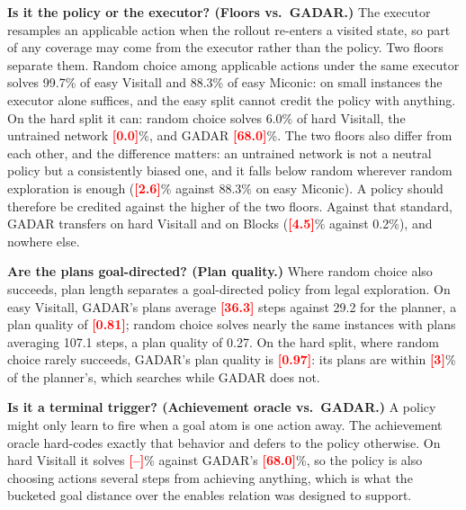 \documentclass[letterpaper]{article} %
\newcommand{\gadar}{GADAR}                 %
\newcommand{\todonum}[1]{\textcolor{red}{\textbf{[#1]}}}
\begin{document}
\textbf{Is it the policy or the executor? (Floors vs.\ \gadar{}.)} The
executor resamples an applicable action when the rollout re-enters a
visited state, so part of any coverage may come from the executor rather
than the policy. Two floors separate them. Random choice among applicable
actions under the same executor solves 99.7\% of easy Visitall and 88.3\%
of easy Miconic: on small instances the executor alone suffices, and the
easy split cannot credit the policy with anything. On the hard split it
can: random choice solves 6.0\% of hard Visitall, the untrained network
\todonum{0.0}\%, and \gadar{} \todonum{68.0}\%. The two floors also differ
from each other, and the difference matters: an untrained network is not a
neutral policy but a consistently biased one, and it falls below random
wherever random exploration is enough (\todonum{2.6}\% against 88.3\% on
easy Miconic). A policy should therefore be credited against the higher of
the two floors. Against that standard, \gadar{} transfers on hard Visitall
and on Blocks (\todonum{4.5}\% against 0.2\%), and nowhere else.

\textbf{Are the plans goal-directed? (Plan quality.)} Where random choice
also succeeds, plan length separates a goal-directed policy from legal
exploration. On easy Visitall, \gadar{}'s plans average \todonum{36.3}
steps against 29.2 for the planner, a plan quality of \todonum{0.81}; random
choice solves nearly the same instances with plans averaging 107.1 steps, a
plan quality of 0.27. On the hard split, where random choice rarely
succeeds, \gadar{}'s plan quality is \todonum{0.97}: its plans are within
\todonum{3}\% of the planner's, which searches while \gadar{} does not.

\textbf{Is it a terminal trigger? (Achievement oracle vs.\ \gadar{}.)} A
policy might only learn to fire when a goal atom is one action away. The
achievement oracle hard-codes exactly that behavior and defers to the
policy otherwise. On hard Visitall it solves \todonum{--}\% against
\gadar{}'s \todonum{68.0}\%, so the policy is also choosing actions several
steps from achieving anything, which is what the bucketed goal distance
over the enables relation was designed to support.
\end{document}
